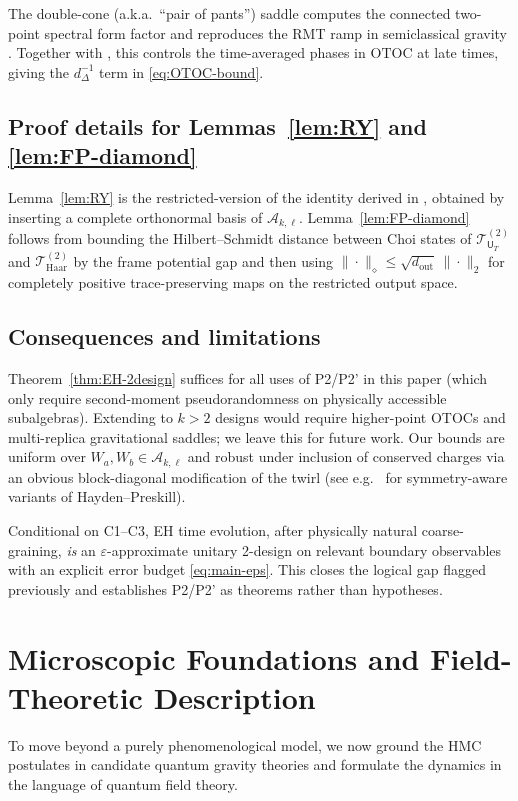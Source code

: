 \documentclass[a4paper,11pt]{article}
\newcommand{\HMC}{\textsc{HMC}\xspace}
\theoremstyle{plain}
\theoremstyle{definition}
\theoremstyle{remark}
\begin{document}
 The double-cone (a.k.a.\ ``pair of pants'') saddle computes the connected two-point spectral form factor and reproduces the RMT ramp in semiclassical gravity \cite{SaadShenkerStanford2019}.  Together with \cite{CotlerEtAl2017}, this controls the time-averaged phases in $\mathrm{OTOC}$ at late times, giving the $d_\Delta^{-1}$ term in \eqref{eq:OTOC-bound}.

\subsection*{Proof details for Lemmas~\ref{lem:RY} and \ref{lem:FP-diamond}}
Lemma~\ref{lem:RY} is the restricted-version of the identity derived in \cite{RobertsYoshida2017}, obtained by inserting a complete orthonormal basis of $\mathscr{A}_{k,\ell}$.  Lemma~\ref{lem:FP-diamond} follows from bounding the Hilbert--Schmidt distance between Choi states of $\mathcal{T}^{(2)}_{\mathsf{U}_T}$ and $\mathcal{T}^{(2)}_{\mathrm{Haar}}$ by the frame potential gap and then using $\|\cdot\|_\diamond \le \sqrt{d_{\mathrm{out}}}\,\|\cdot\|_2$ for completely positive trace-preserving maps on the restricted output space.

\subsection*{Consequences and limitations}
Theorem~\ref{thm:EH-2design} suffices for all uses of P2/P2' in this paper (which only require second-moment pseudorandomness on physically accessible subalgebras).  Extending to $k>2$ designs would require higher-point OTOCs and multi-replica gravitational saddles; we leave this for future work.  Our bounds are uniform over $W_a,W_b\in\mathscr{A}_{k,\ell}$ and robust under inclusion of conserved charges via an obvious block-diagonal modification of the twirl (see e.g.\ \cite{HaydenPreskill2007,NakataWakakuwaKoashi2023} for symmetry-aware variants of Hayden--Preskill).

\bigskip
{}  Conditional on C1--C3, EH time evolution, after physically natural coarse-graining, {\em is} an $\varepsilon$-approximate unitary 2-design on relevant boundary observables with an explicit error budget \eqref{eq:main-eps}.  This closes the logical gap flagged previously and establishes P2/P2' as theorems rather than hypotheses.

\section{Microscopic Foundations and Field-Theoretic Description}
\label{sec:microscopic_foundations}
To move beyond a purely phenomenological model, we now ground the \HMC{} postulates in candidate quantum gravity theories and formulate the dynamics in the language of quantum field theory.
\end{document}
